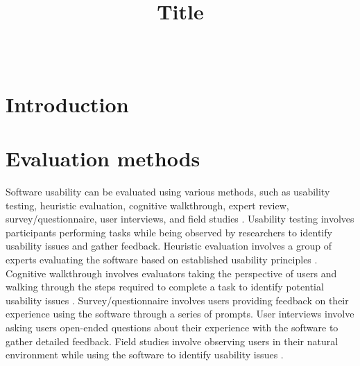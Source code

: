 \documentclass[conference,onecolumn]{IEEEtran}
\begin{document}
\title{Title\\}

\author{\\

}

\maketitle
		

\begin{abstract}

\end{abstract}

\begin{IEEEkeywords}

\end{IEEEkeywords}

\newpage
\tableofcontents

\newpage
\section{Introduction}

	
\section{Evaluation methods}

    Software usability can be evaluated using various methods, such as usability testing, heuristic evaluation, cognitive walkthrough, expert review, survey/questionnaire, user interviews, and field studies \cite{sauro2012standardized}. Usability testing involves participants performing tasks while being observed by researchers to identify usability issues and gather feedback. Heuristic evaluation involves a group of experts evaluating the software based on established usability principles \cite{rubin2008handbook}. Cognitive walkthrough involves evaluators taking the perspective of users and walking through the steps required to complete a task to identify potential usability issues \cite{albert2013measuring}. Survey/questionnaire involves users providing feedback on their experience using the software through a series of prompts. User interviews involve asking users open-ended questions about their experience with the software to gather detailed feedback. Field studies involve observing users in their natural environment while using the software to identify usability issues \cite{sauro2016quantifying}.
\end{document}
